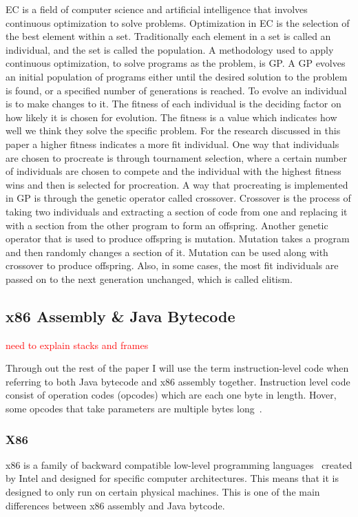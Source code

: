 \documentclass{sig-alternate}
\newcommand{\mycomment}[1]{\textcolor{red}{#1}}
\begin{document}
EC is a field of computer science and artificial intelligence that involves continuous optimization to solve problems. Optimization in EC is the selection of the best element within a set. Traditionally each element in a set is called an individual, and the set is called the population. A methodology used to apply continuous optimization, to solve programs as the problem, is GP. A GP evolves an initial population of programs either until the desired solution to the problem is found, or a specified number of generations is reached. To evolve an individual is to make changes to it. The fitness of each individual is the deciding factor on how likely it is chosen for evolution. The fitness is a value which indicates how well we think they solve the specific problem. For the research discussed in this paper a higher fitness indicates a more fit individual. One way that individuals are chosen to procreate is through tournament selection, where a certain number of individuals are chosen to compete and the individual with the highest fitness wins and then is selected for procreation. A way that procreating is implemented in GP is through the genetic operator called crossover. Crossover is the process of taking two individuals and extracting a section of code from one and replacing it with a section from the other program to form an offspring. Another genetic operator that is used to produce offspring is mutation. Mutation takes a program and then randomly changes a section of it. Mutation can be used along with crossover to produce offspring. Also, in some cases, the most fit individuals are passed on to the next generation unchanged, which is called elitism.


\subsection{x86 Assembly \& Java Bytecode}

\mycomment{need to explain stacks and frames}

Through out the rest of the paper I will use the term instruction-level code when referring to both Java bytecode and x86 assembly together. Instruction level code consist of operation codes (opcodes) which are each one byte in length. Hover, some opcodes that take parameters are multiple bytes long~\cite{JavaBytecode:2014,x86tomachine:2013}.

\subsubsection{X86}
x86 is a family of backward compatible low-level programming languages~\cite{x86:2014} created by Intel and designed for specific computer architectures. This means that it is designed to only run on certain physical machines. This is one of the main differences between x86 assembly and Java bytcode. 
\end{document}
